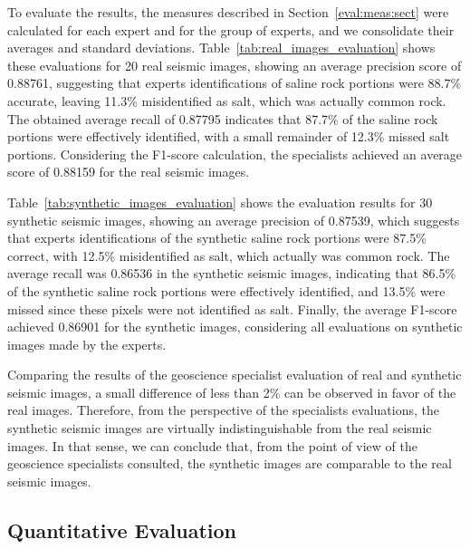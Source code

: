 \documentclass{ieeeaccess}
\begin{document}
To evaluate the results, the measures described in Section~\ref{eval:meas:sect} were calculated for each expert and for the group of experts, and we consolidate their averages and standard deviations. Table~\ref{tab:real_images_evaluation} shows these evaluations for 20 real seismic images, showing an average precision score of 0.88761, suggesting that experts identifications of saline rock portions were 88.7\% accurate, leaving 11.3\% misidentified as salt, which was actually common rock. The obtained average recall of 0.87795 indicates that 87.7\% of the saline rock portions were effectively identified, with a small remainder of 12.3\% missed salt portions. Considering the F1-score calculation, the specialists achieved an average score of 0.88159 for the real seismic images.

Table~\ref{tab:synthetic_images_evaluation} shows the evaluation  results for 30 synthetic seismic images, showing an average precision of 0.87539, which suggests that experts identifications of the synthetic saline rock portions were 87.5\% correct, with 12.5\% misidentified as salt, which actually was common rock. The average recall was 0.86536 in the synthetic seismic images, indicating that 86.5\% of the synthetic saline rock portions were effectively identified, and 13.5\% were missed since these pixels were not identified as salt. Finally, the average F1-score achieved 0.86901 for the synthetic images, considering all evaluations on synthetic images made by the experts.

Comparing the results of the geoscience specialist evaluation of real and synthetic seismic images, a small difference of less than 2\% can be observed in favor of the real images. Therefore, from the perspective of the specialists evaluations, the synthetic seismic images are virtually indistinguishable from the real seismic images. In that sense, we can conclude that, from the point of view of the geoscience specialists consulted, the synthetic images are comparable to the real seismic images.

\subsection{Quantitative Evaluation} 
\end{document}
